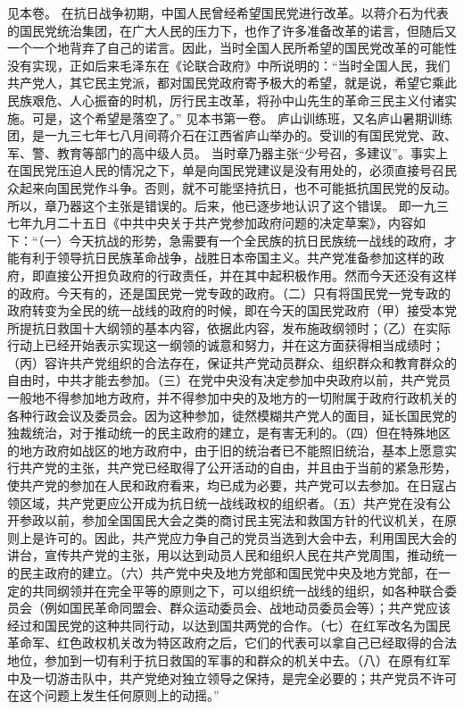\begin{maonote}
见本卷。
在抗日战争初期，中国人民曾经希望国民党进行改革。以蒋介石为代表的国民党统治集团，在广大人民的压力下，也作了许多准备改革的诺言，但随后又一个一个地背弃了自己的诺言。因此，当时全国人民所希望的国民党改革的可能性没有实现，正如后来毛泽东在《论联合政府》中所说明的：“当时全国人民，我们共产党人，其它民主党派，都对国民党政府寄予极大的希望，就是说，希望它乘此民族艰危、人心振奋的时机，厉行民主改革，将孙中山先生的革命三民主义付诸实施。可是，这个希望是落空了。”
见本书第一卷。
庐山训练班，又名庐山暑期训练团，是一九三七年七八月间蒋介石在江西省庐山举办的。受训的有国民党党、政、军、警、教育等部门的高中级人员。
当时章乃器主张“少号召，多建议”。事实上在国民党压迫人民的情况之下，单是向国民党建议是没有用处的，必须直接号召民众起来向国民党作斗争。否则，就不可能坚持抗日，也不可能抵抗国民党的反动。所以，章乃器这个主张是错误的。后来，他已逐步地认识了这个错误。
即一九三七年九月二十五日《中共中央关于共产党参加政府问题的决定草案》，内容如下：“（一）今天抗战的形势，急需要有一个全民族的抗日民族统一战线的政府，才能有利于领导抗日民族革命战争，战胜日本帝国主义。共产党准备参加这样的政府，即直接公开担负政府的行政责任，并在其中起积极作用。然而今天还没有这样的政府。今天有的，还是国民党一党专政的政府。（二）只有将国民党一党专政的政府转变为全民的统一战线的政府的时候，即在今天的国民党政府（甲）接受本党所提抗日救国十大纲领的基本内容，依据此内容，发布施政纲领时；（乙）在实际行动上已经开始表示实现这一纲领的诚意和努力，并在这方面获得相当成绩时；（丙）容许共产党组织的合法存在，保证共产党动员群众、组织群众和教育群众的自由时，中共才能去参加。（三）在党中央没有决定参加中央政府以前，共产党员一般地不得参加地方政府，并不得参加中央的及地方的一切附属于政府行政机关的各种行政会议及委员会。因为这种参加，徒然模糊共产党人的面目，延长国民党的独裁统治，对于推动统一的民主政府的建立，是有害无利的。（四）但在特殊地区的地方政府如战区的地方政府中，由于旧的统治者已不能照旧统治，基本上愿意实行共产党的主张，共产党已经取得了公开活动的自由，并且由于当前的紧急形势，使共产党的参加在人民和政府看来，均已成为必要，共产党可以去参加。在日寇占领区域，共产党更应公开成为抗日统一战线政权的组织者。（五）共产党在没有公开参政以前，参加全国国民大会之类的商讨民主宪法和救国方针的代议机关，在原则上是许可的。因此，共产党应力争自己的党员当选到大会中去，利用国民大会的讲台，宣传共产党的主张，用以达到动员人民和组织人民在共产党周围，推动统一的民主政府的建立。（六）共产党中央及地方党部和国民党中央及地方党部，在一定的共同纲领并在完全平等的原则之下，可以组织统一战线的组织，如各种联合委员会（例如国民革命同盟会、群众运动委员会、战地动员委员会等）；共产党应该经过和国民党的这种共同行动，以达到国共两党的合作。（七）在红军改名为国民革命军、红色政权机关改为特区政府之后，它们的代表可以拿自己已经取得的合法地位，参加到一切有利于抗日救国的军事的和群众的机关中去。（八）在原有红军中及一切游击队中，共产党绝对独立领导之保持，是完全必要的；共产党员不许可在这个问题上发生任何原则上的动摇。”

\end{maonote}
